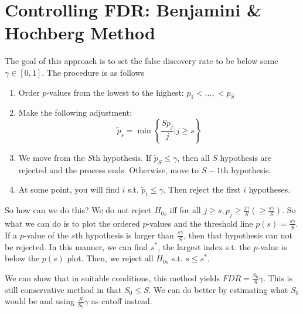 \section{Controlling FDR: Benjamini \& Hochberg Method}
The goal of this approach is to set the false discovery rate to be below some $\gamma\in[0,1]$. The procedure is as follows
\begin{enumerate}
\item Order $p$-values from the lowest to the highest: $p_1<...,<p_S$
\item Make the following adjustment:
\[
\tilde{p}_s = \min\left\{\frac{Sp_j}{j}| j\geq s\right\}
\]
\item We move from the $S$th hypothesis. If $\tilde{p}_S\leq \gamma$, then all $S$ hypothesis are rejected and the process ends. Otherwise, move to $S-1$th hypothesis. 
\item At some point, you will find $i$ s.t. $\tilde{p}_i\leq \gamma$. Then reject the first $i$ hypotheses.
\end{enumerate}
\par
So how can we do this? We do not reject $H_{0s}$ iff for all $j\geq s, p_j\geq \frac{j\gamma}{S} \left(\geq\frac{s\gamma}{S}\right)$. So what we can do is to plot the ordered $p$-values and the threshold line $p(s)=\frac{s\gamma}{S}$. If a $p$-value of the $s$th hypothesis is larger than $\frac{s\gamma}{S}$, then that hypothesis can not be rejected. In this manner, we can find $s^*$, the largest index s.t. the $p$-value is below the $p(s)$ plot. Then, we reject all $H_{0s}$ s.t. $s\leq s^*$. \par
We can show that in suitable conditions, this method yields $FDR=\frac{S_0}{S}\gamma$. This is still conservative method in that $S_0\leq S$. We can do better by estimating what $S_0$ would be and using $\frac{S}{S_0}\gamma$ as cutoff instead. 
